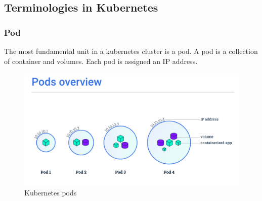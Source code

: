\documentclass[12pt]{article}
\begin{document}
\subsection{Terminologies in Kubernetes}
\subsubsection{Pod}
The most fundamental unit in a kubernetes cluster is a pod. A pod is a collection of container and volumes. Each pod is assigned an IP address.\\
\begin{figure}[h!]
	\begin{center}
		\includegraphics[width=\textwidth, trim= 0 0 0 7cm, clip=true]{pods}
		\caption{Kubernetes pods \cite{Pods}}
	\end{center}
\end{figure}
\end{document}
